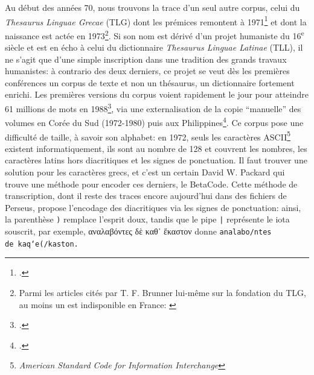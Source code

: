 Au début des années 70, nous trouvons la trace d'un seul autre corpus, celui du \textit{Thesaurus Linguae Grecae} (TLG) dont les prémices remontent à 1971\footcite{brunner_classics_1993} et dont la naissance est actée en 1973\footnote{Parmi les articles cités par T. F. Brunner lui-même sur la fondation du TLG, au moins un est indisponible en France: \cite{Hughes_homer_1987}}. Si son nom est dérivé d'un projet humaniste du 16\textsuperscript{e} siècle et est en écho à celui du dictionnaire \textit{Thesaurus Linguae Latinae} (TLL), il ne s'agit que d'une simple inscription dans une tradition des grands travaux humanistes: à contrario des deux derniers, ce projet se veut dès les premières conférences un corpus de texte et non un thésaurus, un dictionnaire fortement enrichi. Les premières versions du corpus voient rapidement le jour pour atteindre 61 millions de mots en 1988\footcite{brunner_overcoming_1988}, via une externalisation de la copie \enquote{manuelle} des volumes en Corée du Sud (1972-1980) puis aux Philippines\footcite[p. 111]{helgerson_cd-rom_1988}. Ce corpus pose une difficulté de taille, à savoir son alphabet: en 1972, seuls les caractères ASCII\footnote{\textit{American Standard Code for Information Interchange}} existent informatiquement, ils sont au nombre de 128 et couvrent les nombres, les caractères latins hors diacritiques et les signes de ponctuation. Il faut trouver une solution pour les caractères grecs, et c'est un certain David W. Packard qui trouve une méthode pour encoder ces derniers, le BetaCode. Cette méthode de transcription, dont il reste des traces encore aujourd'hui dans des fichiers de Perseus, propose l'encodage des diacritiques via les signes de ponctuation: ainsi, la parenthèse \texttt{)} remplace l'esprit doux, tandis que le pipe \texttt{|} représente le iota souscrit, par exemple, \textgreek{αναλαβόντες δὲ καθ᾽ ἕκαστον} donne \texttt{analabo/ntes de\ kaq`e(/kaston.}


